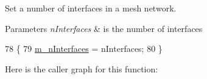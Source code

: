 Set a number of interfaces in a mesh network. 


\begin{DoxyParams}{Parameters}
{\em n\+Interfaces} & is the number of interfaces \\
\hline
\end{DoxyParams}

\begin{DoxyCode}
78 \{
79   \hyperlink{classns3_1_1MeshHelper_a3a64ce44422888e87991eae5342059e3}{m\_nInterfaces} = nInterfaces;
80 \}
\end{DoxyCode}


Here is the caller graph for this function\+:


